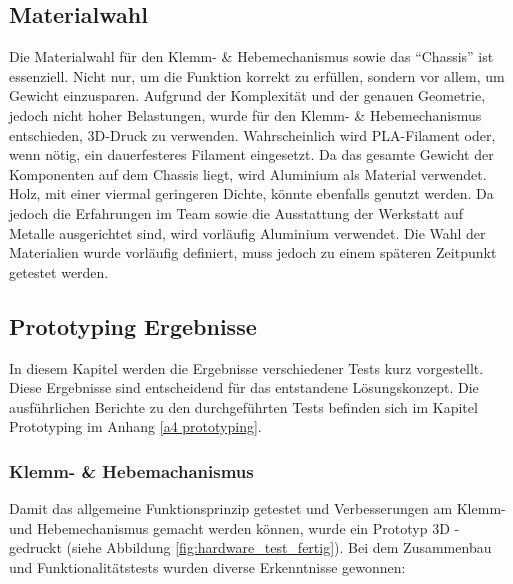 \documentclass[../main.tex]{subfiles}
\begin{document}
\subsection{Materialwahl}
Die Materialwahl für den Klemm- \& Hebemechanismus sowie das \enquote{Chassis} ist essenziell. Nicht nur, um die Funktion korrekt zu erfüllen, sondern vor allem, um Gewicht einzusparen. Aufgrund der Komplexität und der genauen Geometrie, jedoch nicht hoher Belastungen, wurde für den Klemm- \& Hebemechanismus entschieden, 3D-Druck zu verwenden. Wahrscheinlich wird PLA-Filament oder, wenn nötig, ein dauerfesteres Filament eingesetzt. Da das gesamte Gewicht der Komponenten auf dem Chassis liegt, wird Aluminium als Material verwendet. Holz, mit einer viermal geringeren Dichte, könnte ebenfalls genutzt werden. Da jedoch die Erfahrungen im Team sowie die Ausstattung der Werkstatt auf Metalle ausgerichtet sind, wird vorläufig Aluminium verwendet. Die Wahl der Materialien wurde vorläufig definiert, muss jedoch zu einem späteren Zeitpunkt getestet werden.



\subsection{Prototyping Ergebnisse}
In diesem Kapitel werden die Ergebnisse verschiedener Tests kurz vorgestellt. Diese Ergebnisse sind entscheidend für das entstandene Lösungskonzept.
Die ausführlichen Berichte zu den durchgeführten Tests befinden sich im Kapitel Prototyping im Anhang \ref{a4 prototyping}.

\newpage    
\subsubsection{Klemm- \& Hebemachanismus} \label{sec:hardware_greifarm}
Damit das allgemeine Funktionsprinzip getestet und Verbesserungen am Klemm- und Hebemechanismus gemacht werden können, wurde ein Prototyp 3D - gedruckt (siehe Abbildung \ref{fig:hardware_test_fertig}). Bei dem Zusammenbau und Funktionalitätstests wurden diverse Erkenntnisse gewonnen:
\end{document}

